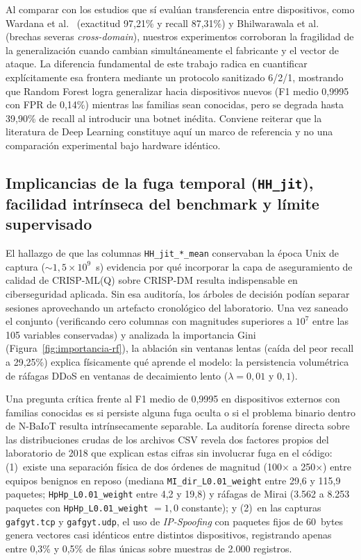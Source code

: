 \documentclass[11pt,a4paper]{article}
\begin{document}
Al comparar con los estudios que sí evalúan transferencia entre dispositivos, como Wardana et al.~\cite{ensembledn} (exactitud 97,21\% y recall 87,31\%) y Bhilwarawala et al.~\cite{bridge2026} (brechas severas \textit{cross-domain}), nuestros experimentos corroboran la fragilidad de la generalización cuando cambian simultáneamente el fabricante y el vector de ataque. La diferencia fundamental de este trabajo radica en cuantificar explícitamente esa frontera mediante un protocolo sanitizado 6/2/1, mostrando que Random Forest logra generalizar hacia dispositivos nuevos (F1 medio 0,9995 con FPR de 0,14\%) mientras las familias sean conocidas, pero se degrada hasta 39,90\% de recall al introducir una botnet inédita. Conviene reiterar que la literatura de Deep Learning constituye aquí un marco de referencia y no una comparación experimental bajo hardware idéntico.

\subsection{Implicancias de la fuga temporal (\texorpdfstring{\texttt{HH\_jit}}{HH\_jit}), facilidad intrínseca del benchmark y límite supervisado}
El hallazgo de que las columnas \texttt{HH\_jit\_*\_mean} conservaban la época Unix de captura ($\sim 1{,}5\times 10^9$~s) evidencia por qué incorporar la capa de aseguramiento de calidad de CRISP-ML(Q) \cite{studer2021crispmlq} sobre CRISP-DM \cite{chapman2000crispdm} resulta indispensable en ciberseguridad aplicada. Sin esa auditoría, los árboles de decisión podían separar sesiones aprovechando un artefacto cronológico del laboratorio. Una vez saneado el conjunto (verificando cero columnas con magnitudes superiores a $10^7$ entre las 105 variables conservadas) y analizada la importancia Gini (Figura~\ref{fig:importancia-rf}), la ablación sin ventanas lentas (caída del peor recall a 29,25\%) explica físicamente qué aprende el modelo: la persistencia volumétrica de ráfagas DDoS en ventanas de decaimiento lento ($\lambda = 0{,}01$ y $0{,}1$).

Una pregunta crítica frente al F1 medio de 0,9995 en dispositivos externos con familias conocidas es si persiste alguna fuga oculta o si el problema binario dentro de N-BaIoT resulta intrínsecamente separable. La auditoría forense directa sobre las distribuciones crudas de los archivos CSV revela dos factores propios del laboratorio de 2018 que explican estas cifras sin involucrar fuga en el código: (1)~existe una separación física de dos órdenes de magnitud (100$\times$ a 250$\times$) entre equipos benignos en reposo (mediana \texttt{MI\_dir\_L0.01\_weight} entre 29,6 y 115,9 paquetes; \texttt{HpHp\_L0.01\_weight} entre 4,2 y 19,8) y ráfagas de Mirai (3.562 a 8.253 paquetes con \texttt{HpHp\_L0.01\_weight} $= 1{,}0$ constante); y (2)~en las capturas \texttt{gafgyt.tcp} y \texttt{gafgyt.udp}, el uso de \textit{IP-Spoofing} con paquetes fijos de 60~bytes genera vectores casi idénticos entre distintos dispositivos, registrando apenas entre 0,3\% y 0,5\% de filas únicas sobre muestras de 2.000 registros.
\end{document}
